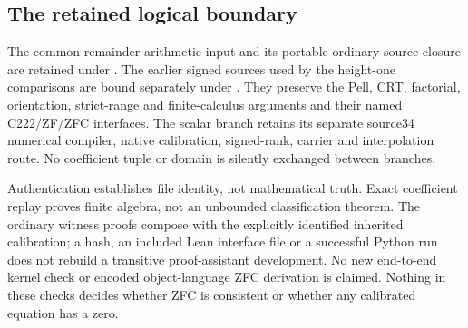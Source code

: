 \subsection{The retained logical boundary}
The common-remainder arithmetic input and its portable ordinary source
closure are retained under . The earlier signed
sources used by the height-one comparisons are bound separately under
. They preserve the Pell, CRT, factorial, orientation,
strict-range and finite-calculus arguments and their named C222/ZF/ZFC
interfaces. The scalar branch retains its separate source34 numerical
compiler, native calibration, signed-rank, carrier and interpolation route.
No coefficient tuple or domain is silently exchanged between branches.

Authentication establishes file identity, not mathematical truth. Exact
coefficient replay proves finite algebra, not an unbounded classification
theorem. The ordinary witness proofs compose with the explicitly identified
inherited calibration; a hash, an included Lean interface file or a successful
Python run does not rebuild a transitive proof-assistant development.
No new end-to-end kernel check or encoded object-language ZFC derivation is
claimed. Nothing in these checks decides whether ZFC is consistent or
whether any calibrated equation has a zero.
